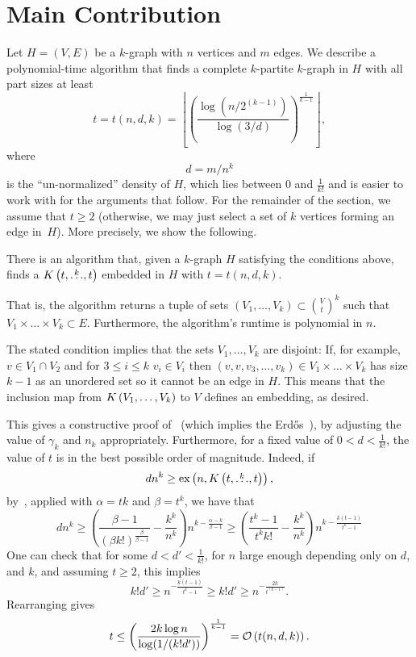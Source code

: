 \section{Main Contribution}\label{sec:algorithm}
Let $H = (V, E)$ be a $k$-graph with $n$ vertices and $m$ edges.
We describe a polynomial-time algorithm that finds a complete $k$-partite $k$-graph in $H$
with all part sizes at least
\begin{equation}
     t = t (n, d, k) = \left\lfloor \left(  \frac{\log \left(n/2^{(k-1)}\right)}{\log (3/d)} \right)^{\frac{1}{k-1}} \right\rfloor \label{eq:t},
\end{equation}
where
\begin{equation} \label{eq:d}
    d = m/n^k
\end{equation}
is the ``un-normalized'' density of $H$,
which lies between $0$ and $\frac{1}{k!}$ and is easier to work with for the arguments that follow.
For the remainder of the section, we assume that
$t \geq 2$ (otherwise, we may just select a set of $k$ vertices forming an edge in~$H$).
More precisely, we show the following.
\begin{theorem}\label{thm:kpartite}
    There is an algorithm that, given a $k$-graph $H$ satisfying the conditions above,
    finds a $K\left(t, \overset{k}{\dots}, t\right)$ embedded in $H$ with $t = t(n, d, k)$.

    That is, the algorithm returns a tuple of sets ${(V_1, \dots, V_k) \subset \binom{V}{t}^k}$ such that
    $V_1 \times \dots \times V_k \subset E$.
    Furthermore, the algorithm's runtime is polynomial in $n$.
\end{theorem}

\begin{remark}
    The stated condition implies that the sets $V_1, \dots, V_k$ are disjoint:
    If, for example, $v \in V_1 \cap V_2$ and for $3 \leq i \leq k$ $v_i \in V_i$ then
    $(v, v, v_3, \dots, v_k) \in V_1 \times \dots \times V_k$ has size $k-1$ as an unordered set so it cannot
    be an edge in $H$.
    This means that the inclusion map from $K\left(V_1, \dots, V_k\right)$ to $V$ defines an embedding, as desired.
\end{remark}

This gives a constructive proof of~ (which implies the Erdős~),
by adjusting the value of $\gamma_k$ and $n_k$ appropriately.
Furthermore, for a fixed value of $0 < d < \frac{1}{k!}$,
the value of $t$ is in the best possible order of magnitude.
Indeed, if
\[
    dn^k \geq \text{ex} \left( n, K\left(t, \overset{k}{\dots}, t\right) \right),
\]
by~,
applied with $\alpha = tk$ and $\beta = t^k$,
we have that
\[
    dn^k \geq \left( \frac{\beta - 1}{(\beta k!)^{\frac{\beta}{\beta - 1}}}  - \frac{k^k}{n^k} \right) n^{k - \frac{\alpha - k}{\beta - 1}}
    \geq \left( \frac{t^k - 1}{t^k k!}  - \frac{k^k}{n^k} \right) n^{k - \frac{k(t-1)}{t^k - 1}}
\]
One can check that for some $d < d' < \frac{1}{k!}$, for $n$ large enough depending only on $d$, and $k$,
and assuming $t \geq 2$,
this implies
\[
    k! d' \geq n^{-\frac{k(t-1)}{t^k - 1}} \geq k! d' \geq n^{-\frac{2k}{t^{(k-1)}}}.
\]
Rearranging gives
\[
    t \leq \left( \frac{2k\log n}{\log (1/(k!d'))} \right)^{\frac{1}{k-1}} = \mathcal{O}\left(t(n, d, k)\right).
\]

